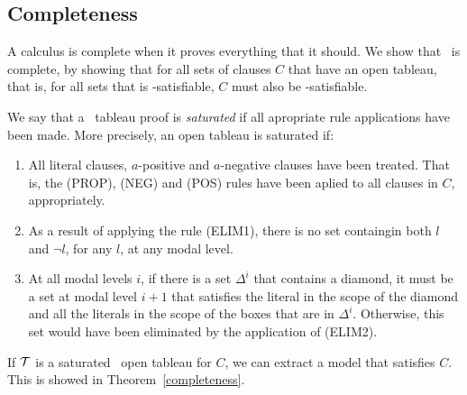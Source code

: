 \subsection{Completeness}
\label{sec:complete}

A calculus is complete when it proves everything that it should. We show that
\ckn~is complete, by showing that for all sets of clauses $C$ that have an open
tableau, that is, for all sets that is \ckn-satisfiable, $C$ must also be
-satisfiable.

\begin{definition}
\label{def:saturated} 
    We say that a \ckn~tableau proof is \emph{saturated} if all apropriate rule
    applications have been made. More precisely, an open tableau is saturated
    if:
    \begin{enumerate}
        \item All literal clauses, $a$-positive and $a$-negative clauses have
            been treated. That is, the (PROP), (NEG) and (POS) rules have been
            aplied to all clauses in $C$, appropriately.
        \item As a result of applying the rule (ELIM1), there is no set
            containgin both $l$ and $\neg l$, for any $l$, at any modal level.
        \item At all modal levels $i$, if there is a set $\Delta^i$ that contains a
            diamond, it must be a set at modal level $i+1$ that satisfies the
            literal in the scope of the diamond and all the literals in the
            scope of the boxes that are in $\Delta^i$. Otherwise, this set would
            have been eliminated by the application of (ELIM2).
    \end{enumerate}
\end{definition}

If $\cal{T}$ is a saturated \ckn~open tableau for $C$, we can extract a model
that satisfies $C$. This is showed in Theorem~\ref{completeness}.

